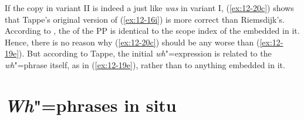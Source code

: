 \documentclass[output=paper]{langsci/langscibook}
\begin{document}
If the copy in variant II is indeed a  just like \textit{was} in variant I, (\ref{ex:12-20c}) shows that Tappe's original version of
(\ref{ex:12-16i}) is more correct than Riemsdijk's. According to \citet{Riemsdijk1982},
the  of the PP is identical to the scope index of the
 embedded in it. Hence, there is no reason why (\ref{ex:12-20c}) should be
any worse than (\ref{ex:12-19e}). But according to Tappe, the initial \emph{wh}"=expression is related to the \emph{wh}"=phrase itself, as in
(\ref{ex:12-19e}), rather than to anything embedded in it.

\section{\textit{Wh}"=phrases in situ}
\label{sec:12-6}
\end{document}
